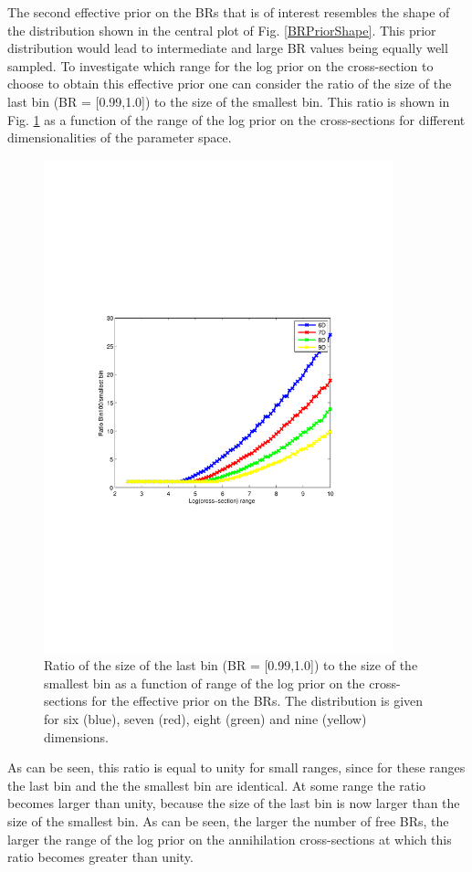 \documentclass{article}
\begin{document}
The second effective prior on the BRs that is of interest resembles the shape of the distribution shown in the central plot of Fig. \ref{BRPriorShape}. This prior distribution would lead to intermediate and large BR values being equally well sampled. To investigate which range for the log prior on the cross-section to choose to obtain this effective prior one can consider the ratio of the size of the last bin (BR = [0.99,1.0]) to the size of the smallest bin. This ratio is shown in Fig. \ref{Bin100_Binsmallest} as a function of the range of the log prior on the cross-sections for different dimensionalities of the parameter space.  
\begin{figure}
\centering
\includegraphics[trim = 70 240 90 240, clip = true, width=0.9\textwidth]{figs/Ratio_Bin100_Binsmallest}
\caption{Ratio of the size of the last bin (BR = [0.99,1.0]) to the size of the smallest bin as a function of range of the log prior on the cross-sections for the effective prior on the BRs. The distribution is given for six (blue), seven (red), eight (green) and nine (yellow) dimensions.}
\label{Bin100_Binsmallest}
\end{figure}
As can be seen, this ratio is equal to unity for small ranges, since for these ranges the last bin and the the smallest bin are identical. At some range the ratio becomes larger than unity, because the size of the last bin is now larger than the size of the smallest bin. As can be seen, the larger the number of free BRs, the larger the range of the log prior on the annihilation cross-sections at which this ratio becomes greater than unity.
\end{document}
